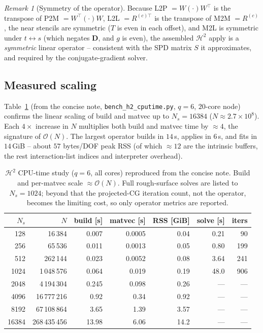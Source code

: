 \documentclass[11pt,a4paper]{article}
\newcommand{\Order}{\mathcal{O}}
\newcommand{\Htwo}{\mathcal{H}^2}
\newcommand{\code}[1]{\texttt{#1}}
\theoremstyle{definition}
\theoremstyle{remark}
\newtheorem{remark}{Remark}
\begin{document}
\begin{remark}[Symmetry of the operator]
\label{rem:symmetry}
Because L2P $=W(\cdot)W^\top$ is the transpose of P2M $=W^\top(\cdot)W$, L2L
$=R^{(c)\top}$ is the transpose of M2M $=R^{(c)}$, the near stencils are
symmetric ($T$ is even in each offset), and M2L is symmetric under
$t\leftrightarrow s$ (which negates $\mathbf D$, and $g$ is even), the assembled
$\Htwo$ apply is a \emph{symmetric} linear operator -- consistent with the SPD
matrix $S$ it approximates, and required by the conjugate-gradient solver.
\end{remark}

\subsection{Measured scaling}

Table~\ref{tab:cputime} (from the concise note, \code{bench\_h2\_cputime.py},
$q=6$, $20$-core node) confirms the linear scaling of build and matvec up to
$N_s=16384$ ($N\approx2.7\times10^8$). Each $4\times$ increase in $N$ multiplies
both build and matvec time by $\approx4$, the signature of $\Order(N)$. The
largest operator builds in $14$\,s, applies in $6$\,s, and fits in $14$\,GiB --
about $57$ bytes/DOF peak RSS (of which $\approx12$ are the intrinsic buffers, the
rest interaction-list indices and interpreter overhead).

\begin{table}[h]
\centering
\begin{tabular}{rrrrrrr}
\toprule
$N_s$ & $N$ & build [s] & matvec [s] & RSS [GiB] & solve [s] & iters \\
\midrule
128   & 16\,384       & 0.007 & 0.0005 & 0.04 & 0.21 & 90 \\
256   & 65\,536       & 0.011 & 0.0013 & 0.05 & 0.80 & 199 \\
512   & 262\,144      & 0.023 & 0.0052 & 0.08 & 3.64 & 241 \\
1024  & 1\,048\,576   & 0.064 & 0.019  & 0.19 & 48.0 & 906 \\
2048  & 4\,194\,304   & 0.245 & 0.098  & 0.26 & ---  & --- \\
4096  & 16\,777\,216  & 0.92  & 0.34   & 0.92 & ---  & --- \\
8192  & 67\,108\,864  & 3.65  & 1.39   & 3.57 & ---  & --- \\
16384 & 268\,435\,456 & 13.98 & 6.06   & 14.2 & ---  & --- \\
\bottomrule
\end{tabular}
\caption{$\Htwo$ CPU-time study ($q=6$, all cores) reproduced from the concise
note. Build and per-matvec scale $\approx\Order(N)$. Full rough-surface solves are
listed to $N_s=1024$; beyond that the projected-CG iteration count, not the
operator, becomes the limiting cost, so only operator metrics are reported.}
\label{tab:cputime}
\end{table}
\end{document}
